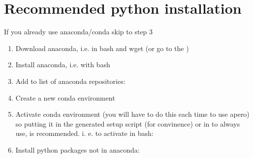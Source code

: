 \documentclass[a4paper,10pt,english]{report}
\begin{document}
\section{Recommended python installation}
\label{\detokenize{misc/pythoninstallation:recommended-python-installation}}\label{\detokenize{misc/pythoninstallation:python-installation}}\label{\detokenize{misc/pythoninstallation::doc}}
If you already use anaconda/conda skip to step 3
\begin{enumerate}
%
\item {} 
Download anaconda, i.e. in bash and wget (or go to the
)
\begin{quote}

\end{quote}

\item {} 
Install anaconda, i.e. with bash
\begin{quote}

\end{quote}

\item {} \begin{description}
\item[{Add  to list of anaconda repositories:}] \leavevmode
{}

\end{description}

\item {} \begin{description}
\item[{Create a new conda environment}] \leavevmode
{}

\end{description}

\item {} 
Activate conda environment (you will have to do this each time to use apero)
so putting it in the generated setup script (for convinence) or in
  to always use, is recommended.
i. e. to activate in bash:

\item {} \begin{description}
\item[{Install python packages not in anaconda:}] \leavevmode
{}

\end{description}

\end{enumerate}
\end{document}
